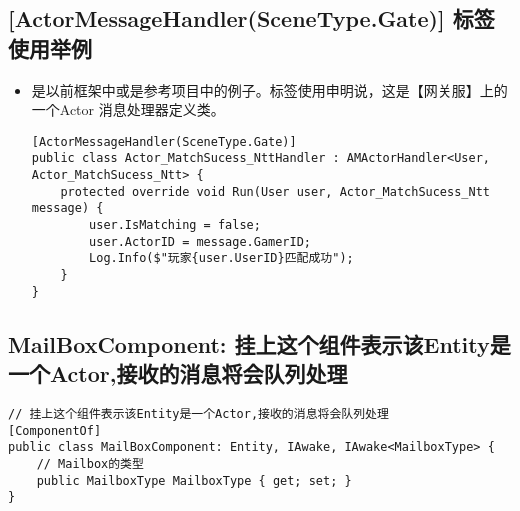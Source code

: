 \documentclass[9pt, b5paper]{article}
\begin{document}
\subsection{[ActorMessageHandler(SceneType.Gate)] 标签使用举例}
\label{sec-8-15}
\begin{itemize}
\item 是以前框架中或是参考项目中的例子。标签使用申明说，这是【网关服】上的一个Actor 消息处理器定义类。
\begin{verbatim}
[ActorMessageHandler(SceneType.Gate)]
public class Actor_MatchSucess_NttHandler : AMActorHandler<User, Actor_MatchSucess_Ntt> {
    protected override void Run(User user, Actor_MatchSucess_Ntt message) {
        user.IsMatching = false;
        user.ActorID = message.GamerID;
        Log.Info($"玩家{user.UserID}匹配成功");
    }
}
\end{verbatim}
\end{itemize}
\subsection{MailBoxComponent: 挂上这个组件表示该Entity是一个Actor,接收的消息将会队列处理}
\label{sec-8-16}
\begin{verbatim}
// 挂上这个组件表示该Entity是一个Actor,接收的消息将会队列处理
[ComponentOf]
public class MailBoxComponent: Entity, IAwake, IAwake<MailboxType> {
    // Mailbox的类型
    public MailboxType MailboxType { get; set; }
}
\end{verbatim}
\end{document}
